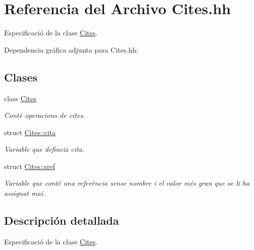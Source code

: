 \hypertarget{_cites_8hh}{}\section{Referencia del Archivo Cites.\+hh}
\label{_cites_8hh}


Especificació de la clase \hyperlink{class_cites}{Cites}.  


Dependencia gráfica adjunta para Cites.\+hh\+:
\subsection*{Clases}
\begin{DoxyCompactItemize}
\item 
class \hyperlink{class_cites}{Cites}
\begin{DoxyCompactList}\small\item\em Conté operacions de cites. \end{DoxyCompactList}\item 
struct \hyperlink{struct_cites_1_1cita}{Cites\+::cita}
\begin{DoxyCompactList}\small\item\em Variable que defineix cita. \end{DoxyCompactList}\item 
struct \hyperlink{struct_cites_1_1sref}{Cites\+::sref}
\begin{DoxyCompactList}\small\item\em Variable que conté una referència sense nombre i el valor més gran que se li ha assignat mai. \end{DoxyCompactList}\end{DoxyCompactItemize}


\subsection{Descripción detallada}
Especificació de la clase \hyperlink{class_cites}{Cites}. 

